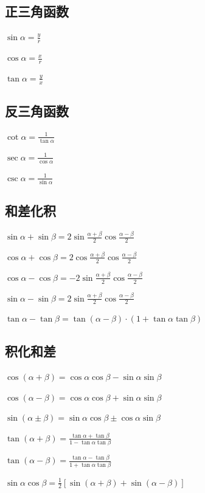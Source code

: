 \documentclass[UTF8]{ctexbook}
\begin{document}
{{\subsection{正三角函数}{
  $\sin{\alpha} = \frac{y}{r}$

  $\cos{\alpha} = \frac{x}{r}$

  $\tan{\alpha} = \frac{y}{x}$
}%

\subsection{反三角函数}{
  $\cot{\alpha} = \frac{1}{\tan{\alpha}}$

  $\sec{\alpha} = \frac{1}{\cos{\alpha}}$

  $\csc{\alpha} = \frac{1}{\sin{\alpha}}$
}%

\subsection{和差化积}{
  $\sin{\alpha}+\sin{\beta} = 2\sin{\frac{\alpha + \beta}{2}}\cos{\frac{\alpha - \beta}{2}}$

  $\cos{\alpha}+\cos{\beta} = 2\cos{\frac{\alpha + \beta}{2}\cos{\frac{\alpha-\beta}{2}}}$

  $\cos{\alpha}-\cos{\beta} = -2\sin{\frac{\alpha + \beta}{2}}\cos{\frac{\alpha - \beta}{2}}$

  $\sin{\alpha}-\sin{\beta} = 2\sin{\frac{\alpha + \beta}{2}}\cos{\frac{\alpha - \beta}{2}}$

  $\tan\alpha - \tan\beta = \tan(\alpha - \beta) \cdot (1 + \tan\alpha\tan\beta)$
}%

\subsection{积化和差}{
  $\cos(\alpha + \beta) = \cos{\alpha}\cos{\beta} - \sin{\alpha}\sin{\beta}$

  $\cos(\alpha - \beta) = \cos{\alpha}\cos{\beta} + \sin{\alpha}\sin{\beta}$

  $\sin(\alpha \pm \beta) = \sin{\alpha}\cos{\beta} \pm \cos{\alpha}\sin{\beta}$

  $\tan(\alpha + \beta) = \frac{\tan\alpha + \tan\beta}{1 - \tan\alpha\tan\beta}$

  $\tan(\alpha - \beta) = \frac{\tan\alpha - \tan\beta}{1 + \tan\alpha\tan\beta}$

  $\sin{\alpha}\cos{\beta} = \frac{1}{2}[\sin{(\alpha + \beta)} + \sin{(\alpha - \beta)}]$

}}}
\end{document}
